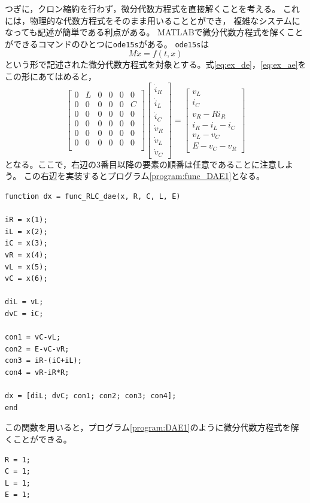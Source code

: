 \documentclass[tombow,dvipdfmx]{corona-a5-1.1}
\begin{document}
\begin{例}[簡単な例題]
つぎに，クロン縮約を行わず，微分代数方程式を直接解くことを考える。
これには，物理的な代数方程式をそのまま用いることとができ，
複雑なシステムになっても記述が簡単である利点がある。
MATLABで微分代数方程式を解くことができるコマンドのひとつに\verb|ode15s|がある。
\verb|ode15s|は
\[
  M\dot{x} = f(t, x)
\]
という形で記述された微分代数方程式を対象とする。式\ref{eq:ex_de}，\ref{eq:ex_ae}をこの形にあてはめると，
\[
  \begin{bmatrix}
    0 & L & 0 & 0 & 0 & 0 \\
    0 & 0 & 0 & 0 & 0 & C \\
    0 & 0 & 0 & 0 & 0 & 0 \\
    0 & 0 & 0 & 0 & 0 & 0 \\
    0 & 0 & 0 & 0 & 0 & 0 \\
    0 & 0 & 0 & 0 & 0 & 0 \\
  \end{bmatrix}
  \begin{bmatrix}
    \dot i_R \\\dot i_L\\\dot i_C\\\dot v_R\\\dot v_L\\\dot v_C
  \end{bmatrix}
  =\begin{bmatrix}
    v_L \\i_C\\v_R-R i_R\\i_R-i_L-i_C\\v_L-v_C\\E-v_C-v_R
  \end{bmatrix}
\]
となる。ここで，右辺の3番目以降の要素の順番は任意であることに注意しよう。
この右辺を実装するとプログラム\nobreak\ref{program:func_DAE1}となる。

\begin{PROGRAMA}[count,title={func\_RLC\_dae.m}]\label{program:func_DAE1}
\begin{verbatim}
function dx = func_RLC_dae(x, R, C, L, E)

iR = x(1);
iL = x(2);
iC = x(3);
vR = x(4);
vL = x(5);
vC = x(6);

diL = vL;
dvC = iC;

con1 = vC-vL;
con2 = E-vC-vR;
con3 = iR-(iC+iL);
con4 = vR-iR*R;

dx = [diL; dvC; con1; con2; con3; con4];
end
\end{verbatim}
\end{PROGRAMA}
この関数を用いると，プログラム\nobreak\ref{program:DAE1}のように微分代数方程式を解くことができる。
\begin{PROGRAMA}[count,title={main\_RLC\_dae.m}]\label{program:DAE1}
\begin{verbatim}
R = 1;
C = 1;
L = 1;
E = 1;


\end{verbatim}
\end{PROGRAMA}
\end{例}
\end{document}
